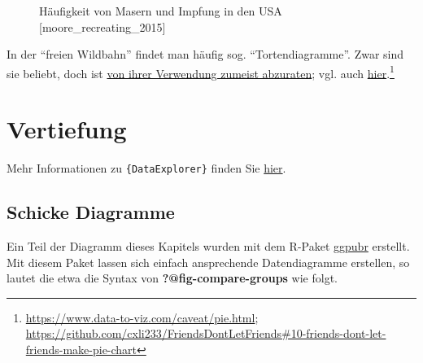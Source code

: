 \documentclass[
  letterpaper,
]{scrbook}
\theoremstyle{definition}
\theoremstyle{definition}
\theoremstyle{definition}
\theoremstyle{remark}
\begin{document}
\begin{figure}


\caption{\label{fig-vaccine}Häufigkeit von Masern und Impfung in den USA
{[}moore\_recreating\_2015{]}}

\end{figure}%

In der ``freien Wildbahn'' findet man häufig sog. ``Tortendiagramme''.
Zwar sind sie beliebt, doch ist
\href{https://www.data-to-viz.com/caveat/pie.html}{von ihrer Verwendung
zumeist abzuraten}; vgl. auch
\href{https://github.com/cxli233/FriendsDontLetFriends\#10-friends-dont-let-friends-make-pie-chart}{hier}.\footnote{\url{https://www.data-to-viz.com/caveat/pie.html};
  \url{https://github.com/cxli233/FriendsDontLetFriends\#10-friends-dont-let-friends-make-pie-chart}}

\section{Vertiefung}\label{vertiefung-4}

Mehr Informationen zu \texttt{\{DataExplorer\}} finden Sie
\href{https://boxuancui.github.io/DataExplorer/index.html}{hier}.

\subsection{Schicke Diagramme}\label{schicke-diagramme}

Ein Teil der Diagramm dieses Kapitels wurden mit dem R-Paket
\href{https://rpkgs.datanovia.com/ggpubr/}{ggpubr} erstellt. Mit diesem
Paket lassen sich einfach ansprechende Datendiagramme erstellen, so
lautet die etwa die Syntax von \textbf{?@fig-compare-groups} wie folgt.
\end{document}
